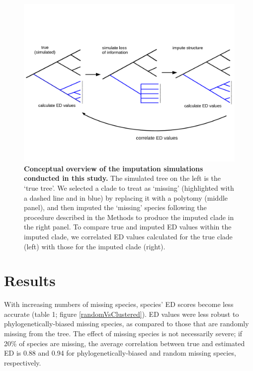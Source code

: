\documentclass[10pt,english]{article}
\begin{document}
\begin{figure}[!ht]
  \center
  \includegraphics[width=.75\textwidth]{imputeConcept.png}
  \caption{\textbf{Conceptual overview of the imputation simulations conducted in this
  study.} The simulated tree on the
  left is the ‘true tree'. We selected a clade to treat as ‘missing'
  (highlighted with a dashed line and in blue) by replacing it with a polytomy (middle
  panel), and then imputed the ‘missing' species following the procedure
  described in the Methods to produce the imputed clade in the
  right panel. To compare true and imputed ED values within the imputed clade,
  we correlated ED values calculated for the true clade (left) with those for the
  imputed clade (right).}
  \label{imputeConcept}
\end{figure}

\section*{Results}
With increasing numbers of missing species, species' ED scores become less accurate (table 1;
figure \ref{randomVsClustered}). ED values were less robust to
phylogenetically-biased missing species, as compared to those that are randomly
missing from the tree. The effect of missing species is not necessarily severe;
if 20\% of species are missing, the average correlation
between true and estimated ED is 0.88 and 0.94 for phylogenetically-biased and
random missing species, respectively.
\end{document}

